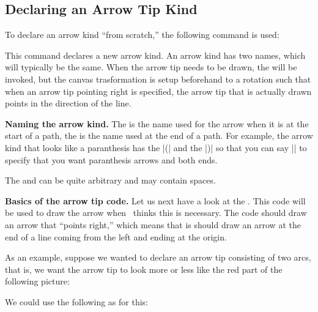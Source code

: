 \subsection{Declaring an Arrow Tip Kind}

To declare an arrow kind ``from scratch,'' the following command is
used:

\begin{command}{\pgfarrowsdeclare{}}
  This command declares a new arrow kind. An arrow kind has two names,
  which will typically be the same. When the arrow tip needs to be
  drawn, the  will be invoked, but the canvas
  trasformation is setup beforehand to a rotation such that when an
  arrow tip pointing right is specified, the arrow tip that is
  actually drawn points in the direction of the line.

  \medskip
  \textbf{Naming the arrow kind.}
  The  is the name
  used for the arrow when it is at the start of a path, the  is the name used at the end of a path. For example, the
  arrow kind that looks like a paranthesis has the  |(| and the  |)| so that you can say
  |\pgfsetarrows{(-)}| to specify that you want paranthesis arrows and
  both ends.

  The  and  can be quite arbitrary and
  may contain spaces.

  \medskip
  \textbf{Basics of the arrow tip code.}
  Let us next have a look at the . This code will
  be used to draw the arrow when \pgfname\ thinks this is
  necessary. The code should draw an arrow that ``points right,''
  which means that is should draw an arrow at the end of a line coming
  from the left and ending at the origin.

  As an example, suppose we wanted to declare an arrow tip consisting
  of two arcs, that is, we want the arrow tip to look more or less
  like the red part of the following picture:
\begin{codeexample}[]
\end{codeexample}

  We could use the following as  for this:
\begin{codeexample}
{
  \pgfsetdash{}{0pt} %
  \pgfsetroundjoin   %
  \pgfsetroundcap    %
  \pgfpathmoveto{\pgfpoint{-10pt}{10pt}}
  \pgfusepathqstroke
}
\end{codeexample}


\end{command}
